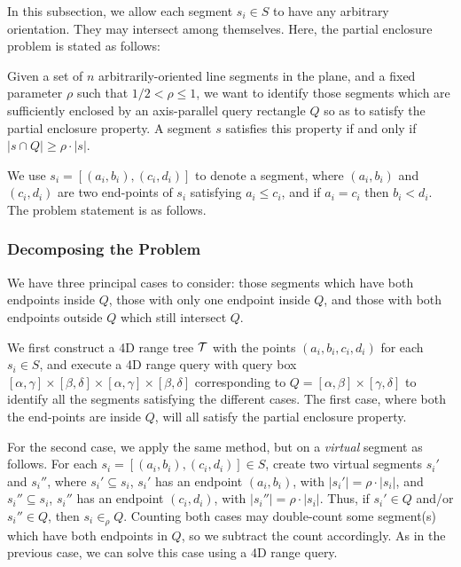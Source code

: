In this subsection, we allow each segment $s_i \in S$ to have any 
arbitrary orientation. They may intersect among themselves. 
Here, the partial enclosure problem is stated as follows:

\begin{problem}
Given a set of $n$ arbitrarily-oriented line segments in the plane, and a 
fixed parameter $\rho$ such that $1/2 < \rho \leq 1$, we want to identify 
those segments which are sufficiently enclosed by an axis-parallel query 
rectangle $Q$ so as to satisfy the partial enclosure property. A segment 
$s$ satisfies this property if and only if $|s \cap Q| \geq \rho \cdot |s|$.
\end{problem}



We use $s_i= [(a_i,b_i), (c_i,d_i)]$ to denote a segment, where $(a_i,b_i)$ 
and $(c_i,d_i)$ are two end-points of $s_i$ satisfying $a_i\leq c_i$, 
and if $a_i = c_i$ then $b_i < d_i$. The problem statement is as 
follows.




\subsubsection{Decomposing the Problem}
\label{:rectangles:ao:approach}

We have three principal cases to consider:  those segments which 
have both endpoints inside $Q$,  those with only one endpoint inside 
$Q$, and  those with both endpoints outside $Q$ which still intersect $Q$.  

We first construct a 4D range tree $\cal T$ with the points $(a_i, b_i, c_i, 
d_i)$ 
for each $s_i \in S$, and execute a 4D range query with query box 
$[\alpha, \gamma] \times [\beta, \delta] \times [\alpha, \gamma] \times 
[\beta, \delta]$ corresponding to $Q=[\alpha,\beta] \times [\gamma,\delta]$ 
to identify all the segments satisfying the different cases. 
The first case, where both the end-points are inside $Q$, will all satisfy the 
partial enclosure property.

For the second case, we apply the same method, but on a {\it virtual} segment as 
follows. For each $s_i=
[(a_i,b_i),(c_i,d_i)] \in S$, create two virtual segments $s_i'$ and 
$s_i''$, where $s_i' \subseteq s_i$, $s_i'$ has an endpoint $(a_i,b_i)$, 
with $|s_i'| = \rho \cdot |s_i|$, and $s_i'' \subseteq s_i$, $s_i''$ 
has an endpoint $(c_i,d_i)$, with $|s_i''| = \rho \cdot |s_i|$. Thus, if 
$s_i' \in Q$ and/or $s_i'' \in Q$, then $s_i \in_\rho Q$. Counting both 
cases may double-count some 
segment(s) which have both endpoints in $Q$, so we subtract the count 
accordingly. 
As in the previous case, we can solve this case using a 4D range query.

